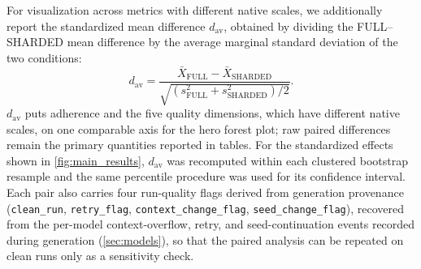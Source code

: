 For visualization across metrics with different native scales, we additionally report the standardized mean difference $d_{\mathrm{av}}$, obtained by dividing the FULL--SHARDED mean difference by the average marginal standard deviation of the two conditions:
\begin{equation}
    \label{eq:dav}
    d_{\mathrm{av}} = \frac{\bar{X}_{\mathrm{FULL}} - \bar{X}_{\mathrm{SHARDED}}}{\sqrt{\left(s_{\mathrm{FULL}}^2 + s_{\mathrm{SHARDED}}^2\right) / 2}}.
\end{equation}
$d_{\mathrm{av}}$ puts adherence and the five quality dimensions, which have different native scales, on one comparable axis for the hero forest plot; raw paired differences remain the primary quantities reported in tables. For the standardized effects shown in \cref{fig:main_results}, $d_{\mathrm{av}}$ was recomputed within each clustered bootstrap resample and the same percentile procedure was used for its confidence interval. Each pair also carries four run-quality flags derived from generation provenance (\texttt{clean\_run}, \texttt{retry\_flag}, \texttt{context\_change\_flag}, \texttt{seed\_change\_flag}), recovered from the per-model context-overflow, retry, and seed-continuation events recorded during generation (\cref{sec:models}), so that the paired analysis can be repeated on clean runs only as a sensitivity check.
